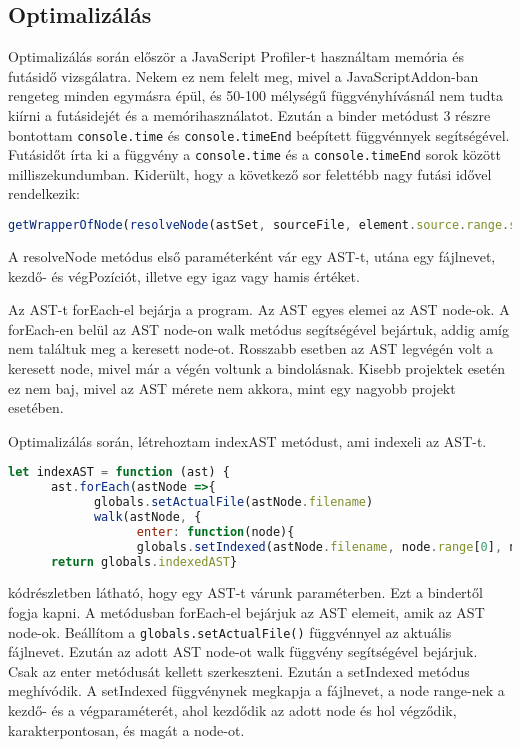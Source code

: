 \subsection{Optimalizálás}

\noindent

Optimalizálás során először a JavaScript Profiler-t használtam memória és futásidő vizsgálatra.
Nekem ez nem felelt meg, mivel a JavaScriptAddon-ban rengeteg minden egymásra épül, és 50-100 mélységű függvényhívásnál nem tudta kiírni a futásidejét és a memórihasználatot.
Ezután a binder metódust 3 részre bontottam \texttt{console.time} és \texttt{console.timeEnd} beépített függvénnyek segítségével.
Futásidőt írta ki a függvény a \texttt{console.time} és a \texttt{console.timeEnd} sorok között milliszekundumban.
Kiderült, hogy a következő sor felettébb nagy futási idővel rendelkezik:

\begin{lstlisting}[caption={Lassú metódus}, label={lst:binder_problemas_function}, language={JavaScript}]
getWrapperOfNode(resolveNode(astSet, sourceFile, element.source.range.start, element.source.range.end, true));
\end{lstlisting}

A resolveNode metódus első paraméterként vár egy AST-t, utána egy fájlnevet, kezdő- és végPozíciót, illetve egy igaz vagy hamis értéket.

Az AST-t forEach-el bejárja a program. Az AST egyes elemei az AST node-ok.
A forEach-en belül az AST node-on walk metódus segítségével bejártuk, addig amíg nem találtuk meg a keresett node-ot.
Rosszabb esetben az AST legvégén volt a keresett node, mivel már a végén voltunk a bindolásnak.
Kisebb projektek esetén ez nem baj, mivel az AST mérete nem akkora, mint egy nagyobb projekt esetében.

\noindent

Optimalizálás során, létrehoztam indexAST metódust, ami indexeli az AST-t.

\begin{lstlisting}[caption={indexAST metódus}, label={lst:indexAST_function}, language={JavaScript}]
let indexAST = function (ast) {
      ast.forEach(astNode =>{
            globals.setActualFile(astNode.filename)
            walk(astNode, {
                  enter: function(node){
                  globals.setIndexed(astNode.filename, node.range[0], node.range[1], node)}})})
      return globals.indexedAST}
\end{lstlisting}

 kódrészletben látható, hogy egy AST-t várunk paraméterben. Ezt a bindertől fogja kapni.
A metódusban forEach-el bejárjuk az AST elemeit, amik az AST node-ok.
Beállítom a \texttt{globals.setActualFile()} függvénnyel az aktuális fájlnevet.
Ezután az adott AST node-ot walk függvény segítségével bejárjuk.
Csak az enter metódusát kellett szerkeszteni.
Ezután a setIndexed metódus meghívódik.
A setIndexed függvénynek megkapja a fájlnevet, a node range-nek a kezdő- és a végparaméterét, ahol kezdődik az adott node és hol végződik, karakterpontosan, és magát a node-ot.

